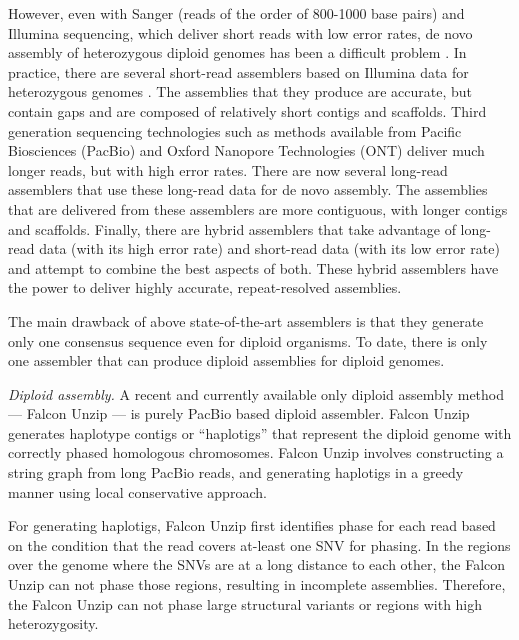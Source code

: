 However, even with Sanger (reads of the order of 800-1000 base pairs) and Illumina sequencing, which deliver short reads with low error rates, de novo assembly of heterozygous diploid genomes has been a difficult problem \citep{vinson2005assembly, levy2007diploid}.
In practice, there are several short-read assemblers based on Illumina data for heterozygous genomes \citep{kajitani2014efficient, pryszcz2016redundans, simpson2012efficient, bankevich2012spades, li2015fermikit}.
The assemblies that they produce are accurate, but contain gaps and are composed of relatively short contigs and scaffolds. 
Third generation sequencing technologies such as methods available from Pacific Biosciences (PacBio) and Oxford Nanopore Technologies (ONT) deliver much longer reads, but with high error rates.
There are now several long-read assemblers \citep{koren2017canu, vaser2017fast, xiao2016mecat, berlin2015assembling, chin2013nonhybrid, hunt2015circlator, lin2016assembly} that use these long-read data for de novo assembly.
The assemblies that are delivered from these assemblers are more contiguous, with longer contigs and scaffolds.
Finally, there are hybrid assemblers that take advantage of long-read data (with its high error rate) and short-read data (with its low error rate) \citep{bashir2012hybrid, antipov2015hybridspades, zimin2017hybrid} and attempt to combine the best aspects of both.
These hybrid assemblers have the power to deliver highly accurate, repeat-resolved assemblies.

The main drawback of above state-of-the-art assemblers is that they generate only one consensus sequence even for diploid organisms. To date, there is only one assembler that can produce diploid assemblies for diploid genomes.

\textit{Diploid assembly.} A recent and currently available only diploid assembly method --- Falcon Unzip \citep{chin2016phased} --- is purely PacBio based diploid assembler.
Falcon Unzip generates haplotype contigs or ``haplotigs'' that represent the diploid genome with correctly phased homologous chromosomes.
Falcon Unzip involves constructing a string graph from long PacBio reads, and generating haplotigs in a greedy manner using local conservative approach.


For generating haplotigs, Falcon Unzip first identifies phase for each read based on the condition that the read covers at-least one SNV for phasing.
In the regions over the genome where the SNVs are at a long distance to each other, the Falcon Unzip can not phase those regions, resulting in incomplete assemblies.
Therefore, the Falcon Unzip can not phase large structural variants or regions with high heterozygosity. 

